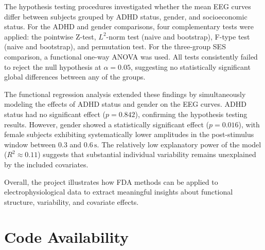 \documentclass[twoside,11pt]{article}
\begin{document}
The hypothesis testing procedures investigated whether the mean EEG curves differ between subjects
grouped by ADHD status, gender, and socioeconomic status. For the ADHD and gender comparisons, four
complementary tests were applied: the pointwise Z-test, $L^2$-norm test (naive and bootstrap),
F-type test (naive and bootstrap), and permutation test. For the three-group SES comparison, a
functional one-way ANOVA was used. All tests consistently failed to reject the null hypothesis at
$\alpha = 0.05$, suggesting no statistically significant global differences between any of the
groups.

The functional regression analysis extended these findings by simultaneously modeling the effects of
ADHD status and gender on the EEG curves. ADHD status had no significant effect ($p = 0.842$),
confirming the hypothesis testing results. However, gender showed a statistically significant effect
($p = 0.016$), with female subjects exhibiting systematically lower amplitudes in the post-stimulus
window between $0.3$ and $0.6\,\mathrm{s}$. The relatively low explanatory power of the model ($R^2
\approx 0.11$) suggests that substantial individual variability remains unexplained by the included
covariates.

Overall, the project illustrates how FDA methods can be applied to electrophysiological data to
extract meaningful insights about functional structure, variability, and covariate effects.

\newpage


\newpage
\appendix

\section{Code Availability}
\end{document}
